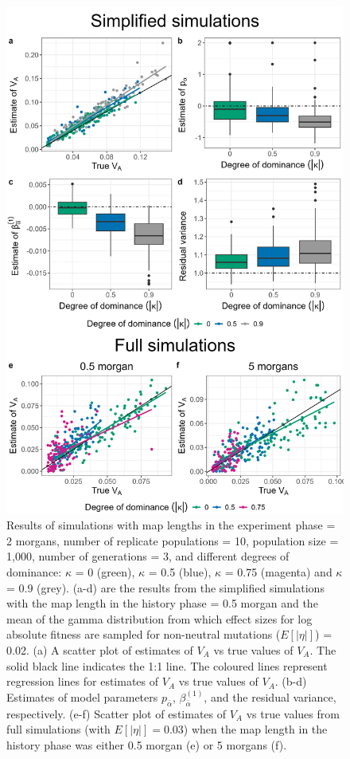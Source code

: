 \documentclass[12pt]{article}
\begin{document}
\begin{bibunit}
\begin{figure}[H]
\includegraphics[scale = 0.12]{Figures/combined_dominance.jpg}
\caption{Results of simulations with map lengths in the experiment phase = 2 morgans, number of replicate populations = 10, population size = 1,000, number of generations = 3, and different degrees of dominance: $\kappa$ = 0 (green), $\kappa$ = 0.5 (blue), $\kappa$ = 0.75 (magenta) and $\kappa$ = 0.9 (grey). (a-d) are the results from the simplified simulations with the map length in the history phase = 0.5 morgan and the mean of the gamma distribution from which effect sizes for log absolute fitness are sampled for non-neutral mutations ($E[|\eta|]$) = 0.02. (a) A scatter plot of estimates of $V_A$ vs true values of $V_A$. The solid black line indicates the 1:1 line. The coloured lines represent regression lines for estimates of $V_A$ vs true values of $V_A$. (b-d) Estimates of model parameters $p_{\bar \alpha}$, $\beta^{(1)}_{\bar{\alpha}}$, and the residual variance, respectively. (e-f) Scatter plot of estimates of $V_A$ vs true values from full simulations (with $E[|\eta|] = 0.03$) when the map length in the history phase was either 0.5 morgan (e) or 5 morgans (f).}
  \label{fig:combined_dominance}
\end{figure}


\end{bibunit}
\end{document}
